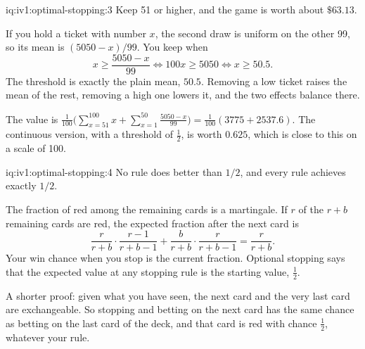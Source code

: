 \enlargethispage{-3\baselineskip}%
\begin{solution}{iq:iv1:optimal-stopping:3}
Keep 51 or higher, and the game is worth about $\$63.13$.

If you hold a ticket with number $x$, the second draw is uniform on the other 99, so its mean is $(5050 - x)/99$. You keep when
\[
x \ge \frac{5050 - x}{99} \iff 100x \ge 5050 \iff x \ge 50.5.
\]
The threshold is exactly the plain mean, $50.5$. Removing a low ticket raises the mean of the rest, removing a high one lowers it, and the two effects balance there.

The value is $\frac{1}{100}\bigl(\sum_{x = 51}^{100} x + \sum_{x = 1}^{50} \frac{5050 - x}{99}\bigr) = \frac{1}{100}(3775 + 2537.6)$. The continuous version, with a threshold of $\tfrac12$, is worth $0.625$, which is close to this on a scale of 100.

\end{solution}

\begin{solution}{iq:iv1:optimal-stopping:4}
No rule does better than $1/2$, and every rule achieves exactly $1/2$.

The fraction of red among the remaining cards is a martingale. If $r$ of the $r + b$ remaining cards are red, the expected fraction after the next card is
\[
\frac{r}{r + b} \cdot \frac{r - 1}{r + b - 1} + \frac{b}{r + b} \cdot \frac{r}{r + b - 1} = \frac{r}{r + b}.
\]
Your win chance when you stop is the current fraction. Optional stopping says that the expected value at any stopping rule is the starting value, $\tfrac12$.

A shorter proof: given what you have seen, the next card and the very last card are exchangeable. So stopping and betting on the next card has the same chance as betting on the last card of the deck, and that card is red with chance $\tfrac12$, whatever your rule.

\end{solution}

